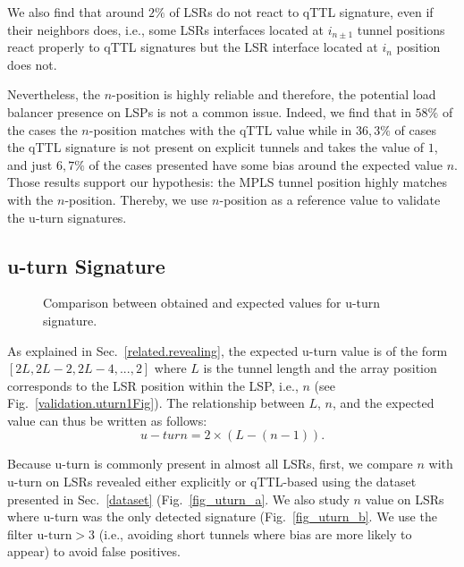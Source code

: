 We also find that around $2\%$ of LSRs do not react to qTTL signature, even if
their neighbors does, i.e., some LSRs interfaces located at $i_{n \pm 1}$
tunnel positions react properly to qTTL signatures but the LSR interface located
at $i_n$ position does not.

Nevertheless, the $n$-position is highly reliable and therefore, the potential
load balancer presence on LSPs is not a common issue. Indeed, we find that in
$58\%$ of the cases the $n$-position matches with the qTTL value while in $36,3\%$ of cases
the qTTL signature is not present on explicit tunnels and takes the value of
$1$, and just $6,7\%$ of the cases presented have some bias around the expected
value $n$. Those results support our hypothesis: the  MPLS tunnel position
highly matches with the $n$-position. Thereby, we use $n$-position as a
reference value to validate the u-turn signatures.

\subsection{u-turn Signature}\label{validation.uturn}
\begin{figure}[!t]
  \begin{center}    
\hspace{-0.3cm}      
  \end{center}
  \caption{Comparison between obtained and expected values for u-turn
  signature.}
  \label{validation.uturn.fig}
\end{figure}

As explained in Sec.~\ref{related.revealing},  the expected u-turn value is of
the form $[2L, 2L-2, 2L-4,..., 2]$ where $L$ is the tunnel length and the array
position corresponds to the LSR position within the LSP, i.e., $n$ (see
Fig.~\ref{validation.uturn1Fig}).  The relationship between $L$, $n$, and the
expected value can thus be written as follows:
\begin{equation}
u-turn = 2 \times (L - (n-1)) .
\label{eqn.uturn}
\end{equation}

Because u-turn is commonly present in almost all LSRs, first, we compare $n$
with u-turn on LSRs revealed either explicitly or qTTL-based using the dataset
presented in Sec.~\ref{dataset} (Fig.~\ref{fig_uturn_a}. We also study 
$n$ value on LSRs where u-turn was the only detected signature
(Fig.~\ref{fig_uturn_b}. We use the filter $\text{u-turn}>3$ (i.e., avoiding
short tunnels where bias are more likely to appear) to avoid false positives.

